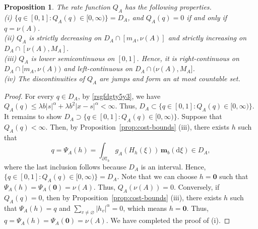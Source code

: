 \documentclass[a4paper, 11pt]{article}
\newcommand{\1}{\mathbf 1}
\theoremstyle{plain}
\newtheorem{proposition}[theorem]{Proposition}
\begin{document}
\begin{proposition}
\label{prop:QA-regularity}
The rate function \(Q_A\) has the following properties.\\
(i) \(\{q\in[0,1]:Q_A(q)\in[0,\infty)\}=D_A\), and \(Q_A(q)=0\) if and only if
  \(q=\nu(A)\).\\
  (ii) \(Q_A\) is strictly decreasing on \(D_A\cap[m_A,\nu(A)]\) and strictly
  increasing on  \(D_A\cap[\nu(A),M_A]\).\\
   (iii) \(Q_A\) is lower semicontinuous on $[0,1]$. Hence, it is right-continuous on \(D_A\cap[m_A,\nu(A))\) and left-continuous on \(D_A\cap(\nu(A),M_A]\).\\
  (iv) The discontinuities of \(Q_A\) are jumps and form an at most countable set.
\end{proposition}
\begin{proof}
For every \(q\in D_A\), by \eqref{rsgfdgty5y3}, we have $Q_A(q)\leq \lambda b|s|^{\alpha}+\lambda b^2|x-s|^{\alpha}<\infty$. Thus,
\(D_A\subset\{q\in[0,1]:Q_A(q)\in[0,\infty)\}\). It remains to show $D_A\supset\{q\in[0,1]:Q_A(q)\in[0,\infty)\}$. Suppose that $Q_A(q)<\infty$. Then, by Proposition~\ref{prop:cost-bounds} (iii), there exists $h$ such that
$$q=\Psi_A(h)= \int_{\partial\mathbb{T}_b}g_A(H_h(\xi))\,\mathbf m_b(\mathrm{d}\xi)\in D_A,$$
where the last inclusion follows because \(D_A\) is an interval. Hence, \(\{q\in[0,1]:Q_A(q)\in[0,\infty)\}=D_A\).
Note that we can choose \(h=\mathbf{0}\)
such that \(\Psi_A(h)=\Psi_A(\mathbf{0})=\nu(A)\).
Thus, $Q_A(\nu(A))=0$. Conversely, if $Q_A(q)=0$, then
by Proposition~\ref{prop:cost-bounds} (iii), there exists $h$
such that $\Psi_A(h)=q$ and $\sum_{v\neq\varnothing}|h_v|^\alpha=0$,
which means $h=\mathbf{0}.$ Thus, $q=\Psi_A(h)=\Psi_A(\mathbf{0})=\nu(A)$. We have completed the proof of (i).
\par


\end{proof}
\end{document}
